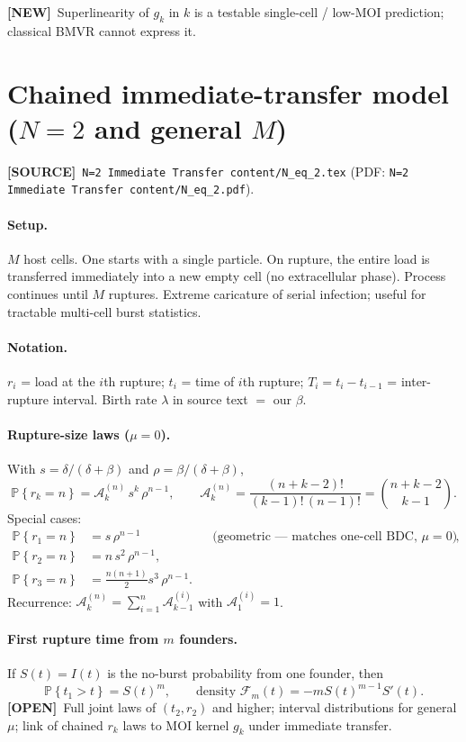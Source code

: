 \documentclass[11pt,a4paper]{article}
\newcommand{\Prob}[1]{\mathbb{P}\!\left\{#1\right\}}
\theoremstyle{plain}
\theoremstyle{definition}
\theoremstyle{remark}
\newcommand{\NEW}{\textcolor{blue!55!black}{\textbf{[NEW]}}}
\newcommand{\OPEN}{\textcolor{red!55!black}{\textbf{[OPEN]}}}
\newcommand{\SOURCE}{\textcolor{gray!50!black}{\textbf{[SOURCE]}}}
\begin{document}
\NEW\ Superlinearity of $g_k$ in $k$ is a testable single-cell / low-MOI
prediction; classical BMVR cannot express it.

\section{Chained immediate-transfer model ($N=2$ and general $M$)}
\label{sec:chain}
\SOURCE\
\texttt{N=2 Immediate Transfer content/N\_eq\_2.tex}
(PDF: \texttt{N=2 Immediate Transfer content/N\_eq\_2.pdf}).

\paragraph{Setup.}
$M$ host cells. One starts with a single particle. On rupture, the entire load
is transferred immediately into a new empty cell (no extracellular phase).
Process continues until $M$ ruptures. Extreme caricature of serial infection;
useful for tractable multi-cell burst statistics.

\paragraph{Notation.}
$r_i$ = load at the $i$th rupture; $t_i$ = time of $i$th rupture;
$T_i=t_i-t_{i-1}$ = inter-rupture interval. Birth rate $\lambda$ in source
text $=$ our $\beta$.

\paragraph{Rupture-size laws ($\mu=0$).}
With $s=\delta/(\delta+\beta)$ and $\rho=\beta/(\delta+\beta)$,
\begin{equation}
\Prob{r_k=n}
=\mathcal{A}^{(n)}_{k}\, s^{k}\,\rho^{n-1},
\qquad
\mathcal{A}^{(n)}_{k}
=\frac{(n+k-2)!}{(k-1)!\,(n-1)!}
=\binom{n+k-2}{k-1}.
\end{equation}
Special cases:
\begin{align*}
\Prob{r_1=n}&=s\,\rho^{n-1}
&&\text{(geometric --- matches one-cell BDC, $\mu=0$)},\\
\Prob{r_2=n}&=n\,s^2\,\rho^{n-1},\\
\Prob{r_3=n}&=\tfrac{n(n+1)}{2}s^3\,\rho^{n-1}.
\end{align*}
Recurrence: $\mathcal{A}^{(n)}_{k}=\sum_{i=1}^{n}\mathcal{A}^{(i)}_{k-1}$ with
$\mathcal{A}^{(i)}_{1}=1$.

\paragraph{First rupture time from $m$ founders.}
If $S(t)=I(t)$ is the no-burst probability from one founder, then
\[
\Prob{t_1>t}=S(t)^m,\qquad
\text{density }\mathcal{F}_m(t)=-m S(t)^{m-1}S'(t).
\]
\OPEN\ Full joint laws of $(t_2,r_2)$ and higher; interval distributions for
general $\mu$; link of chained $r_k$ laws to MOI kernel $g_k$ under immediate
transfer.
\end{document}

